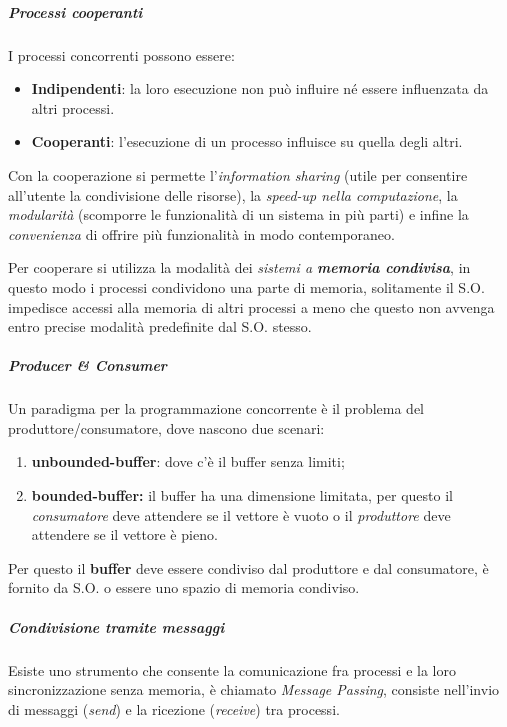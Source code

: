\subparagraph{\texorpdfstring{\emph{Processi
cooperanti}}{Processi cooperanti}}\label{processi-cooperanti}

I processi concorrenti possono essere:

\begin{itemize}
\item
  \textbf{Indipendenti}: la loro esecuzione non può influire né essere
  influenzata da altri processi.
\item
  \textbf{Cooperanti}: l'esecuzione di un processo influisce su quella
  degli altri.
\end{itemize}

Con la cooperazione si permette l'\emph{information sharing} (utile per
consentire all'utente la condivisione delle risorse), la \emph{speed-up
nella computazione}, la \emph{modularità} (scomporre le funzionalità di
un sistema in più parti) e infine la \emph{convenienza} di offrire più
funzionalità in modo contemporaneo.

Per cooperare si utilizza la modalità dei \emph{sistemi a
\textbf{memoria condivisa}}, in questo modo i processi condividono una
parte di memoria, solitamente il S.O. impedisce accessi alla memoria di
altri processi a meno che questo non avvenga entro precise modalità
predefinite dal S.O. stesso.

\subparagraph{\texorpdfstring{\emph{Producer \&
Consumer}}{Producer \& Consumer}}\label{producer-consumer}

Un paradigma per la programmazione concorrente è il problema del
produttore/consumatore, dove nascono due scenari:

\begin{enumerate}
\def\labelenumi{\arabic{enumi}.}
\item
  \textbf{unbounded-buffer}: dove c'è il buffer senza limiti;
\item
  \textbf{bounded-buffer:} il buffer ha una dimensione limitata, per
  questo il \emph{consumatore} deve attendere se il vettore è vuoto o il
  \emph{produttore} deve attendere se il vettore è pieno.
\end{enumerate}

Per questo il \textbf{buffer} deve essere condiviso dal produttore e dal
consumatore, è fornito da S.O. o essere uno spazio di memoria condiviso.

\subparagraph{\texorpdfstring{\emph{Condivisione tramite
messaggi}}{Condivisione tramite messaggi}}\label{condivisione-tramite-messaggi}

Esiste uno strumento che consente la comunicazione fra processi e la
loro sincronizzazione senza memoria, è chiamato \emph{Message Passing},
consiste nell'invio di messaggi (\emph{send}) e la ricezione
(\emph{receive}) tra processi.

